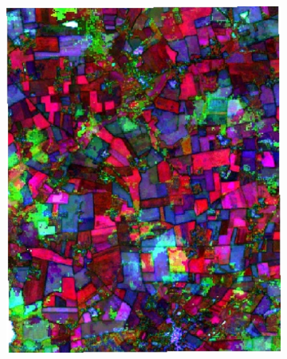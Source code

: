 \documentclass[journal,article,submit,pdftex,moreauthors]{Definitions/mdpi}
\begin{document}
\begin{figure}[H]
\begin{subfigure}[t]{0.23\linewidth}
	\caption{}
	\label{fig:color_map_c}
	\end{subfigure}
	\begin{subfigure}[t]{0.23\linewidth}
		\centering
	\includegraphics[width=0.95\linewidth]{figures/aes_1_layer_mse_results/composites/composite_image_3011141.pdf}
    \caption{}
	\label{fig:color_map_d}
	\end{subfigure}\\[0.2cm]
    \begin{subfigure}[t]{0.23\linewidth}
		\centering

\end{subfigure}
\end{figure}
\end{document}
